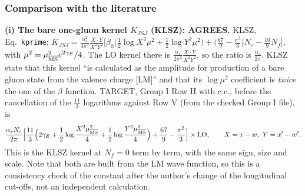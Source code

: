 \subsubsection{Comparison with the literature}
\textbf{(i) The bare one-gluon kernel $K_{JSJ}$ (KLSZ): AGREES.} KLSZ, Eq.~\texttt{kprime}: $K_{JSJ}=\frac{\alpha_{s}^{2}}{4\pi^{3}}\frac{X\cdot Y}{X^{2}Y^{2}}\big[\beta_{0}\big(\frac12\log X^{2}\mu^{2}+\frac12\log Y^{2}\mu^{2}\big)+\big(\frac{67}{9}-\frac{\pi^{2}}{3}\big)N_{c}-\frac{10}{9}N_{f}\big]$, with $\mu^{2}=\mu^{2}_{\overline{\rm MS}}e^{2\gamma_{E}}/4$. The LO kernel there is $\frac{\alpha_{s}}{2\pi^{2}}\frac{X\cdot Y}{X^{2}Y^{2}}$, so the ratio is $\frac{\alpha_{s}}{2\pi}$. KLSZ state that this kernel ``is calculated as the amplitude for production of a bare gluon state from the valence charge [LM]'' and that its $\log\mu^{2}$ coefficient is \emph{twice} the one of the $\beta$ function. TARGET, Group I Row II with c.c., before the cancellation of the $\frac{11}{3}$ logarithms against Row V (from the checked Group I file), is
\begin{align}
\frac{\alpha_{s}N_{c}}{2\pi}\Big[\frac{11}{3}\Big(2\gamma_{E}+\frac12\log\frac{X^{2}\mu^{2}_{\overline{\rm MS}}}{4}+\frac12\log\frac{Y^{2}\mu^{2}_{\overline{\rm MS}}}{4}\Big)+\frac{67}{9}-\frac{\pi^{2}}{3}\Big]\times{\rm LO},\qquad X=x-w,\ Y=x'-w'.\notag
\end{align}
This is the KLSZ kernel at $N_{f}=0$ term by term, with the same sign, size and scale. Note that both are built from the LM wave function, so this is a consistency check of the constant after the author's change of the longitudinal cut-offs, not an independent calculation.

